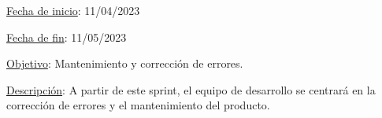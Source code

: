 
\underline{Fecha de inicio}: 11/04/2023

\underline{Fecha de fin}: 11/05/2023

\underline{Objetivo}:
Mantenimiento y corrección de errores.

\underline{Descripción}:
A partir de este sprint, el equipo de desarrollo se centrará en la corrección de errores y el mantenimiento del
producto.
